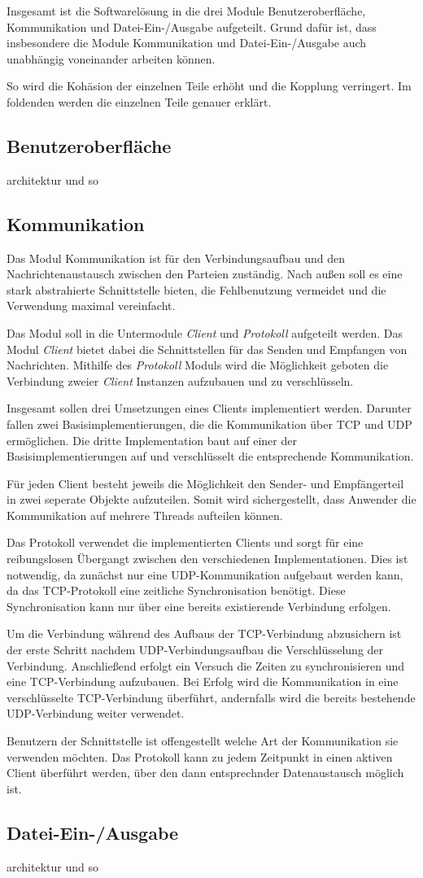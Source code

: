 Insgesamt ist die Softwarelösung in die drei Module Benutzeroberfläche, Kommunikation und Datei-Ein-/Ausgabe aufgeteilt. Grund dafür ist, dass insbesondere die Module Kommunikation und Datei-Ein-/Ausgabe auch unabhängig voneinander arbeiten können.

So wird die Kohäsion der einzelnen Teile erhöht und die Kopplung verringert. Im foldenden werden die einzelnen Teile genauer erklärt.

\subsection{Benutzeroberfläche}
architektur und so

\subsection{Kommunikation}
Das Modul Kommunikation ist für den Verbindungsaufbau und den Nachrichtenaustausch zwischen den Parteien zuständig. Nach außen soll es eine stark abstrahierte Schnittstelle bieten, die Fehlbenutzung vermeidet und die Verwendung maximal vereinfacht.

Das Modul soll in die Untermodule \textit{Client} und \textit{Protokoll} aufgeteilt werden. Das Modul \textit{Client} bietet dabei die Schnittstellen für das Senden und Empfangen von Nachrichten. Mithilfe des \textit{Protokoll} Moduls wird die Möglichkeit geboten die Verbindung zweier \textit{Client} Instanzen aufzubauen und zu verschlüsseln.

Insgesamt sollen drei Umsetzungen eines Clients implementiert werden. Darunter fallen zwei Basisimplementierungen, die die Kommunikation über TCP und UDP ermöglichen. Die dritte Implementation baut auf einer der Basisimplementierungen auf und verschlüsselt die entsprechende Kommunikation.

Für jeden Client besteht jeweils die Möglichkeit den Sender- und Empfängerteil in zwei seperate Objekte aufzuteilen. Somit wird sichergestellt, dass Anwender die Kommunikation auf mehrere Threads aufteilen können.

Das Protokoll verwendet die implementierten Clients und sorgt für eine reibungslosen Übergangt zwischen den verschiedenen Implementationen. Dies ist notwendig, da zunächst nur eine UDP-Kommunikation aufgebaut werden kann, da das TCP-Protokoll eine zeitliche Synchronisation benötigt. Diese Synchronisation kann nur über eine bereits existierende Verbindung erfolgen.

Um die Verbindung während des Aufbaus der TCP-Verbindung abzusichern ist der erste Schritt nachdem UDP-Verbindungsaufbau die Verschlüsselung der Verbindung. Anschließend erfolgt ein Versuch die Zeiten zu synchronisieren und eine TCP-Verbindung aufzubauen. Bei Erfolg wird die Kommunikation in eine verschlüsselte TCP-Verbindung überführt, andernfalls wird die bereits bestehende UDP-Verbindung weiter verwendet.

Benutzern der Schnittstelle ist offengestellt welche Art der Kommunikation sie verwenden möchten. Das Protokoll kann zu jedem Zeitpunkt in einen aktiven Client überführt werden, über den dann entsprechnder Datenaustausch möglich ist.

\subsection{Datei-Ein-/Ausgabe}
architektur und so
